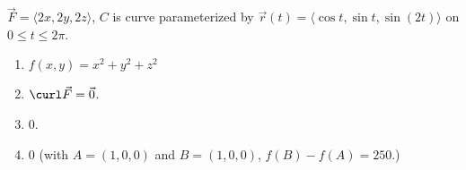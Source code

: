 {$\vec F = \langle 2x, 2y, 2z\rangle$, $C$ is curve parameterized by $\vec r(t) = \langle \cos t,\sin t, \sin (2t)\rangle$ on $0\leq t\leq 2\pi$. 
}
{\begin{enumerate}
\item		$f(x,y) = x^2+y^2+z^2$
\item	$\curl \vec F = \vec 0$.
\item		$0$.%
\item	$0$ (with $A = (1,0,0)$ and $B = (1,0,0)$, $f(B) - f(A) = 250$.)
\end{enumerate}
}
